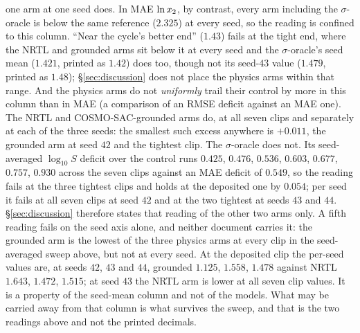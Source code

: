 one arm at one seed does. In MAE $\ln x_2$, by contrast, every arm including the $\sigma$-oracle is
below the same reference ($2.325$) at every seed, so the reading is confined to this column.
``Near the cycle's better end'' ($1.43$) fails at the tight end, where the NRTL and grounded arms sit
below it at every seed and the $\sigma$-oracle's seed mean ($1.421$, printed as $1.42$) does too,
though not its seed-$43$ value ($1.479$, printed as $1.48$); \S\ref{sec:discussion} does not place
the physics arms within that range.
And the physics arms do not \emph{uniformly} trail their control by more in this column than in MAE
(a comparison of an RMSE deficit against an MAE one). The NRTL and COSMO-SAC-grounded arms do, at
all seven clips and separately at each of the three seeds: the smallest such excess anywhere is
$+0.011$, the grounded arm at seed $42$ and the tightest clip. The $\sigma$-oracle does not. Its
seed-averaged $\log_{10}S$ deficit over the control runs $0.425$, $0.476$, $0.536$, $0.603$, $0.677$,
$0.757$, $0.930$ across the seven clips against an MAE deficit of $0.549$, so the reading fails at
the three tightest clips and holds at the deposited one by $0.054$; per seed it fails at all seven
clips at seed $42$ and at the two tightest at seeds $43$ and $44$. \S\ref{sec:discussion} therefore
states that reading of the other two arms only.
A fifth reading fails on the seed axis alone, and neither document carries it: the grounded arm is the
lowest of the three physics arms at every clip in the seed-averaged sweep above, but not at every seed.
At the deposited clip the per-seed values are, at seeds $42$, $43$ and $44$, grounded $1.125$,
$1.558$, $1.478$ against NRTL $1.643$, $1.472$, $1.515$; at seed $43$ the NRTL arm is lower at all
seven clip values. It is a property of the seed-mean column and not of the models.
What may be carried away from that column is what survives the sweep, and that is the two readings
above and not the printed decimals.

